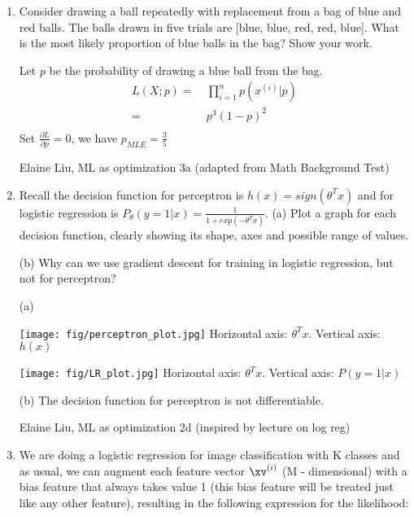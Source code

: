 \begin{enumerate}
    \item Consider drawing a ball repeatedly with replacement from a bag of blue and red balls. The balls drawn in five trials are [blue, blue, red, red, blue]. What is the most likely proportion of blue balls in the bag? Show your work.
    
    \begin{soln}
    Let $p$ be the probability of drawing a blue ball from the bag.
    \begin{align*}
        L(X;p) =&\ \prod_{i=1}^n p(x^{(i)} | p)\\ 
        =&\ p^3(1-p)^2\\ 
    \end{align*}
    Set $\frac{\partial L}{\partial p} = 0$, we have $p_{MLE} = \frac{3}{5}$
    \end{soln}
    
    \begin{qauthor}
    Elaine Liu, ML as optimization 3a (adapted from Math Background Test)
    \end{qauthor}
    
    
    \item Recall the decision function for perceptron is $h(x) = sign(\theta^T x)$ and for logistic regression is $P_{\theta} (y=1|x) = \frac{1}{1 + exp(-\theta^T x)}$. 
    (a) Plot a graph for each decision function, clearly showing its shape, axes and possible range of values. 
    
    (b) Why can we use gradient descent for training in logistic regression, but not for perceptron?
    
    \begin{soln}
    (a) 
    
    \texttt{[image: fig/perceptron\_plot.jpg]}
    Horizontal axis: $\theta^T x$. Vertical axis: $h(x)$
    
    \texttt{[image: fig/LR\_plot.jpg]}
    Horizontal axis: $\theta^T x$. Vertical axis: $P (y=1|x)$
    
    (b) The decision function for perceptron is not differentiable.
    \end{soln}
    
    \begin{qauthor}
    Elaine Liu, ML as optimization 2d (inspired by lecture on log reg)
    \end{qauthor}
    
    
\item We are doing a logistic regression for image classification with K classes and as usual, we can augment each feature vector $\xv^{(i)}$ (M - dimensional) with a bias feature that always takes value 1 (this bias feature will be treated just like any other feature), resulting in the following expression for the likelihood:


\end{enumerate}
